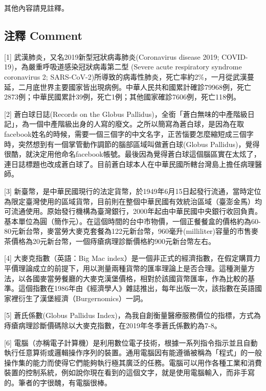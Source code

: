 \documentclass[a5paper, 11pt
]{book}
\begin{document}
其他內容請見註釋。

\hypertarget{ux6ce8ux91cb-comment}{%
\subsection{注釋 Comment}\label{ux6ce8ux91cb-comment}}

{[}1{]} 武漢肺炎，又名2019新型冠狀病毒肺炎(Coronavirus disease 2019;
COVID-19)，為嚴重呼吸道感染冠狀病毒第二型 (Severe acute respiratory
syndrome coronavirus 2;
SARS-CoV-2)所導致的病毒性肺炎，死亡率約2\%，一月從武漢蔓延，二月底世界主要國家皆出現病例。中華人民共和國累計確診79968例，死亡2873例；中華民國累計39例，死亡1例；其他國家確診7606例，死亡118例。

{[}2{]} 蒼白球日誌(Records on the Globus
Pallidus)，全銜「蒼白無味的中產階級日記」，為一個中產階級出身的人寫的廢文。之所以簡寫為蒼白球，是因為在取facebook姓名的時候，需要一個三個字的中文名字，正苦惱要怎麼縮短成三個字時，突然想到有一個掌管動作調節的腦部區域叫做蒼白球(Globus
Pallidus)，覺得很酷，就決定用他命名facebook帳號。最後因為覺得蒼白球這個腦區實在太炫了，連日誌標題也改成蒼白球了。目前蒼白球本人在中華民國所轄台灣島上擔任病理醫師。

{[}3{]}
新臺幣，是中華民國現行的法定貨幣，於1949年6月15日起發行流通，當時定位為限定臺灣使用的區域貨幣，目前則在整個中華民國有效統治區域（臺澎金馬）均可流通使用。原始發行機構為臺灣銀行，2000年起由中華民國中央銀行收回負責。基本單位為圓（簡作元）。在這個時間的台中市物價，一個正餐餐盒的價格約為60-80元新台幣，麥當勞大麥克套餐為122元新台幣，960毫升(milliliter)容量的市售麥茶價格為20元新台幣，一個痔瘡病理診斷價格約900元新台幣左右。

{[}4{]} 大麥克指數（英語：Big Mac
index）是一個非正式的經濟指數，在假定購買力平價理論成立的前提下，用以測量兩種貨幣的匯率理論上是否合理。這種測量方法，以各國麥當勞餐廳的大麥克漢堡價格，相對於該國貨幣匯率，作為比較的基準。這個指數在1986年由《經濟學人》雜誌推出，每年出版一次，該指數在英語國家裡衍生了漢堡經濟（Burgernomics）一詞。

{[}5{]} 蒼氏係數(Globus Pallidus
Index)，為我自創衡量醫療服務價位的指標，方式為痔瘡病理診斷價碼除以大麥克指數，在2019年冬季蒼氏係數約為7-8。

{[}6{]}
電腦（亦稱電子計算機）是利用數位電子技術，根據一系列指令指示並且自動執行任意算術或邏輯操作序列的裝置。通用電腦因有能遵循被稱為「程式」的一般操作集的能力而使得它們能夠執行極其廣泛的任務。電腦可以用作各種工業和消費裝置的控制系統，例如說你現在看到的這個文字，就是使用電腦輸入，而非手寫的。筆者的字很醜，有電腦很棒。
\end{document}
